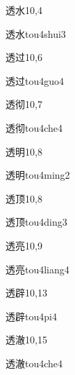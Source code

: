 \begin{entry}{透水}{10,4}
  \begin{phonetics}{透水}{tou4shui3}
  \end{phonetics}
\end{entry}

\begin{entry}{透过}{10,6}
  \begin{phonetics}{透过}{tou4guo4}
  \end{phonetics}
\end{entry}

\begin{entry}{透彻}{10,7}
  \begin{phonetics}{透彻}{tou4che4}
  \end{phonetics}
\end{entry}

\begin{entry}{透明}{10,8}
  \begin{phonetics}{透明}{tou4ming2}
  \end{phonetics}
\end{entry}

\begin{entry}{透顶}{10,8}
  \begin{phonetics}{透顶}{tou4ding3}
  \end{phonetics}
\end{entry}

\begin{entry}{透亮}{10,9}
  \begin{phonetics}{透亮}{tou4liang4}
  \end{phonetics}
\end{entry}

\begin{entry}{透辟}{10,13}
  \begin{phonetics}{透辟}{tou4pi4}
  \end{phonetics}
\end{entry}

\begin{entry}{透澈}{10,15}
  \begin{phonetics}{透澈}{tou4che4}
  \end{phonetics}
\end{entry}

